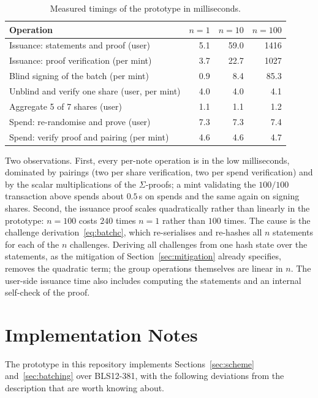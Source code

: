 \documentclass[10pt,a5paper]{article}
\newcommand{\tabsize}{\small}\newcommand{\legendsize}{\footnotesize}
\newcommand{\tabsize}{}\newcommand{\legendsize}{\small}
\begin{document}
\begin{table}[htbp]
\centering
\caption{Measured timings of the prototype in milliseconds.}
\label{tab:timings}
\tabsize
\begin{tabular}{@{}lrrr@{}}
\toprule
Operation & $n=1$ & $n=10$ & $n=100$ \\
\midrule
Issuance: statements and proof (user) & 5.1 & 59.0 & 1416 \\
Issuance: proof verification (per mint) & 3.7 & 22.7 & 1027 \\
Blind signing of the batch (per mint) & 0.9 & 8.4 & 85.3 \\
Unblind and verify one share (user, per mint) & 4.0 & 4.0 & 4.1 \\
Aggregate 5 of 7 shares (user) & 1.1 & 1.1 & 1.2 \\
Spend: re-randomise and prove (user) & 7.3 & 7.3 & 7.4 \\
Spend: verify proof and pairing (per mint) & 4.6 & 4.6 & 4.7 \\
\bottomrule
\end{tabular}
\end{table}

Two observations. First, every per-note operation is in the low milliseconds,
dominated by pairings (two per share verification, two per spend verification)
and by the scalar multiplications of the $\Sigma$-proofs; a mint validating the
$100/100$ transaction above spends about $0.5$\,s on spends and the same again
on signing shares. Second, the issuance proof scales quadratically rather than
linearly in the prototype: $n = 100$ costs $240$ times $n = 1$ rather than
$100$ times. The cause is the challenge derivation~\eqref{eq:batchc}, which
re-serialises and re-hashes all $n$ statements for each of the $n$
challenges. Deriving all challenges from one hash state over the statements,
as the mitigation of Section~\ref{sec:mitigation} already specifies, removes
the quadratic term; the group operations themselves are linear in $n$. The
user-side issuance time also includes computing the statements and an internal
self-check of the proof.

\section{Implementation Notes}
\label{sec:impl}

The prototype in this repository implements Sections~\ref{sec:scheme}
and~\ref{sec:batching} over BLS12-381, with the following deviations from the
description that are worth knowing about.
\end{document}
